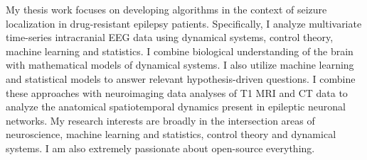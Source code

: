 

\begin{cvparagraph}

My thesis work focuses on developing algorithms in the context of seizure localization in drug-resistant epilepsy patients. Specifically, I analyze multivariate time-series intracranial EEG data using dynamical systems, control theory, machine learning and statistics. I combine biological understanding of the brain with mathematical models of dynamical systems. I also utilize machine learning and statistical models to answer relevant hypothesis-driven questions. I combine these approaches with neuroimaging data analyses of T1 MRI and CT data to analyze the anatomical spatiotemporal dynamics present in epileptic neuronal networks. My research interests are broadly in the intersection areas of neuroscience, machine learning and statistics, control theory and dynamical systems. I am also extremely passionate about open-source everything.

\end{cvparagraph}
